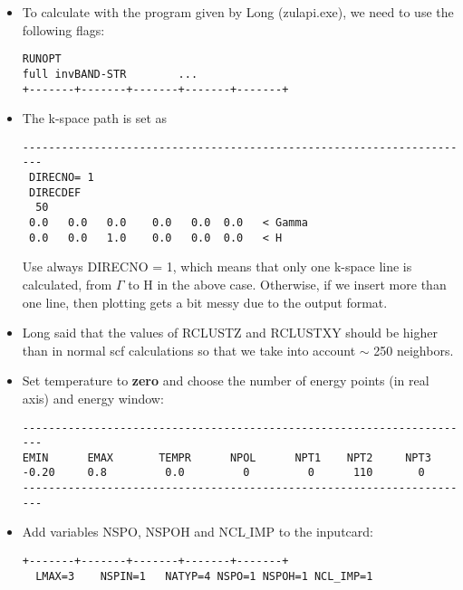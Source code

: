 \documentclass[11pt,fleqn]{book} %
\begin{document}
\begin{itemize}


\item To calculate with the program given by Long (zulapi.exe), we need to use the following
flags:
\begin{VBox}
\begin{verbatim}
RUNOPT
full invBAND-STR        ...
+-------+-------+-------+-------+-------+
\end{verbatim}
\end{VBox}

\item The k-space path is set as
\begin{VBox}
\begin{verbatim}
----------------------------------------------------------------------
 DIRECNO= 1
 DIRECDEF
  50
 0.0   0.0   0.0    0.0   0.0  0.0   < Gamma
 0.0   0.0   1.0    0.0   0.0  0.0   < H
\end{verbatim}
\end{VBox}

Use always DIRECNO = 1, which means that only one k-space line
is calculated, from $\Gamma$ to H in the above case.
Otherwise, if we insert more than one line, then plotting
gets a bit messy due to the output format.

\item Long said that the values of RCLUSTZ and RCLUSTXY
should be higher than in normal scf calculations so that
we take into account $\sim$ 250 neighbors.

\item Set temperature to \textbf{zero} and choose the number of energy points (in real axis)
and energy window:
\begin{VBox}
\begin{verbatim}
----------------------------------------------------------------------
EMIN      EMAX       TEMPR      NPOL      NPT1    NPT2     NPT3
-0.20     0.8         0.0         0         0      110       0
----------------------------------------------------------------------
\end{verbatim}
\end{VBox}
\item Add variables NSPO, NSPOH and NCL$\_$IMP to the inputcard:
\begin{VBox}
\begin{verbatim}
+-------+-------+-------+-------+-------+
  LMAX=3    NSPIN=1   NATYP=4 NSPO=1 NSPOH=1 NCL_IMP=1
\end{verbatim}
\end{VBox}


\end{itemize}
\end{document}
